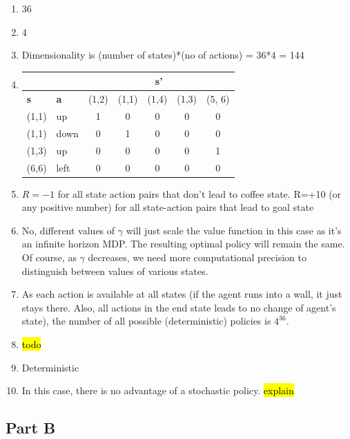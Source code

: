 \documentclass{article}
\begin{document}
\begin{enumerate}[label=(\alph*)]
\item 36
\item 4
\item Dimensionality is (number of states)*(no of actions) = 36*4 = 144
\item  \begin{center}
    \begin{tabular}{|l|l|c|c|c|c|c|}\hline
      \multicolumn{2}{|c|}{} &
                               \multicolumn{5}{|c|}{\textbf{s'}}\\\hline
      \textbf{s} & \textbf{a} & (1,2) & (1,1) & (1,4) & (1,3) & (5, 6)\\\hline
      (1,1) & up & 1 & 0 & 0 & 0 & 0\\ \hline
      (1,1) & down & 0 & 1 & 0 & 0 & 0 \\ \hline
      (1,3) & up & 0 & 0 & 0 & 0  &1 \\ \hline
      (6,6) & left & 0 & 0 & 0 &0 &0\\ \hline
    \end{tabular}
  \end{center}

\item $R=-1$ for all state action pairs that don't lead to coffee state. R=+10 (or any positive number) for all state-action pairs that lead to goal state

\item No, different values of $\gamma$ will just scale the value function in this case as it's an infinite horizon MDP. The resulting optimal policy will remain the same. Of course, as $\gamma$ decreases, we need more computational precision to distinguish between values of various states.

\item As each action is available at all states (if the agent runs into a wall, it just stays there. Also, all actions in the end state leads to no change of agent's state), the number of all possible (deterministic) policies is $4^{36}$.

\item \hl{todo}
\item Deterministic
\item In this case, there is no advantage of a stochastic policy. \hl{explain}
 
\end{enumerate}

\subsection{Part B}
\end{document}

